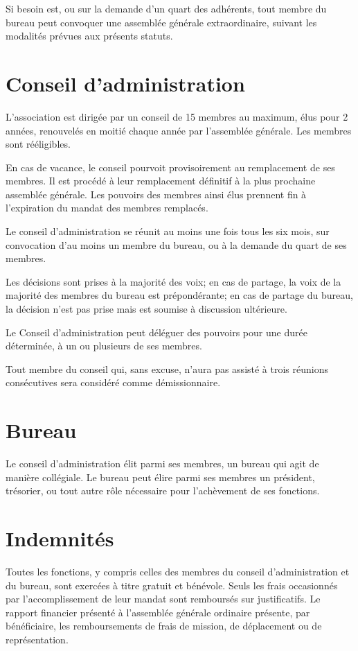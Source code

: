 \documentclass[11 pt]{article}
\begin{document}
Si besoin est, ou sur la demande d’un quart des adhérents, tout membre
du bureau peut convoquer une assemblée générale extraordinaire,
suivant les modalités prévues aux présents statuts.

\section{Conseil d’administration}

L’association est dirigée par un conseil de 15 membres au maximum,
élus pour 2 années, renouvelés en moitié chaque année par l’assemblée
générale. Les membres sont rééligibles.

En cas de vacance, le conseil pourvoit provisoirement au remplacement
de ses membres. Il est procédé à leur remplacement définitif à la
plus prochaine assemblée générale. Les pouvoirs des membres ainsi élus
prennent fin à l’expiration du mandat des membres remplacés.

Le conseil d’administration se réunit au moins une fois tous les six
mois, sur convocation d’au moins un membre du bureau, ou à la demande
du quart de ses membres.

Les décisions sont prises à la majorité des voix; en cas de partage,
la voix de la majorité des membres du bureau est prépondérante; en cas
de partage du bureau, la décision n’est pas prise mais est soumise à
discussion ultérieure.

Le Conseil d’administration peut déléguer des pouvoirs pour une durée
déterminée, à un ou plusieurs de ses membres.

Tout membre du conseil qui, sans excuse, n’aura pas assisté à trois
réunions consécutives sera considéré comme démissionnaire.


\section{Bureau}

Le conseil d’administration élit parmi ses membres, un bureau qui agit
de manière collégiale.  Le bureau peut élire parmi ses membres un président,
trésorier, ou tout autre rôle nécessaire pour l’achèvement de ses fonctions.

\section{Indemnités}

Toutes les fonctions, y compris celles des membres du conseil
d’administration et du bureau, sont exercées à titre gratuit et bénévole. Seuls les
frais occasionnés par l’accomplissement de leur mandat sont remboursés
sur justificatifs. Le rapport financier présenté à l’assemblée
générale ordinaire présente, par bénéficiaire, les remboursements de
frais de mission, de déplacement ou de représentation.
\end{document}
